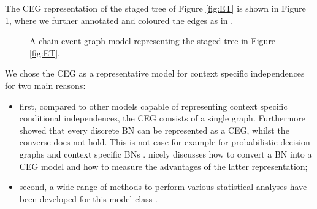 \begin{example}
 The \gls{CEG} representation of the staged tree of Figure \ref{fig:ET} is shown in Figure \ref{fig:CEG}, where we further annotated and coloured the edges as in \citet{Barclay2013a}. 
 \end{example}
 
\begin{figure}
\begin{center}
\end{center}
\caption{A chain event graph model representing the staged tree in Figure \ref{fig:ET}. \label{fig:CEG}}
\end{figure}

We chose the \gls{CEG} as a representative model for context specific independences for two main reasons:
\begin{itemize}
\item first, compared to other models capable of  representing context specific conditional independences,  the \gls{CEG} consists of a single graph. Furthermore   \citet{Smith2008} showed that every discrete \gls{BN} can be represented as a \gls{CEG}, whilst the converse does not hold. This is not case for example for probabilistic decision graphs \citep{Jaeger2004} and context specific \glspl{BN} \citep{Boutilier1996}. \citet{Barclay2013a} nicely discusses how to convert a \gls{BN} into a \gls{CEG} model and how to measure the advantages of the latter representation;
\item second, a wide range of methods to perform various statistical analyses have been developed for this model class \citep[see e.g.][]{Barclay2013a,Barclay2014, Freeman2011, Thwaites2010, Thwaites2015}.
\end{itemize}

